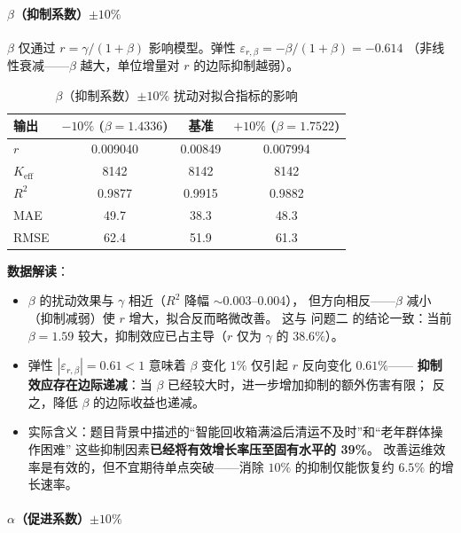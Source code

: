 \documentclass[12pt,a4paper]{ctexart}
\begin{document}
\begin{table}[htbp]
\paragraph{$\beta$（抑制系数）$\pm 10\%$}

$\beta$ 仅通过 $r = \gamma/(1+\beta)$ 影响模型。弹性 $\varepsilon_{r,\beta} = -\beta/(1+\beta) = -0.614$
（非线性衰减——$\beta$ 越大，单位增量对 $r$ 的边际抑制越弱）。

\begin{table}[htbp]
\centering
\caption{$\beta$（抑制系数）$\pm 10\%$ 扰动对拟合指标的影响}
\label{tab:sens_beta}
\begin{tabular}{lccc}
\toprule
输出 & $-10\%$ ($\beta = 1.4336$) & 基准 & $+10\%$ ($\beta = 1.7522$) \\
\midrule
$r$      & 0.009040 & 0.00849 & 0.007994 \\
$K_{\text{eff}}$ & 8142 & 8142 & 8142 \\
$R^2$    & 0.9877 & 0.9915 & 0.9882 \\
MAE      & 49.7 & 38.3 & 48.3 \\
RMSE     & 62.4 & 51.9 & 61.3 \\
\bottomrule
\end{tabular}
\end{table}

\textbf{数据解读}：
\begin{itemize}
  \item $\beta$ 的扰动效果与 $\gamma$ 相近（$R^2$ 降幅 $\sim$0.003--0.004），
        但方向相反——$\beta$ 减小（抑制减弱）使 $r$ 增大，拟合反而略微改善。
        这与 问题二 的结论一致：当前 $\beta = 1.59$ 较大，抑制效应已占主导（$r$ 仅为 $\gamma$ 的 $38.6\%$）。
  \item 弹性 $|\varepsilon_{r,\beta}| = 0.61 < 1$ 意味着 $\beta$ 变化 $1\%$ 仅引起 $r$ 反向变化 $0.61\%$——
        \textbf{抑制效应存在边际递减}：当 $\beta$ 已经较大时，进一步增加抑制的额外伤害有限；
        反之，降低 $\beta$ 的边际收益也递减。
  \item 实际含义：题目背景中描述的``智能回收箱满溢后清运不及时''和``老年群体操作困难''
        这些抑制因素\textbf{已经将有效增长率压至固有水平的 39\%}。
        改善运维效率是有效的，但不宜期待单点突破——消除 $10\%$ 的抑制仅能恢复约 $6.5\%$ 的增长速率。
\end{itemize}

\paragraph{$\alpha$（促进系数）$\pm 10\%$}


\end{table}
\end{document}
